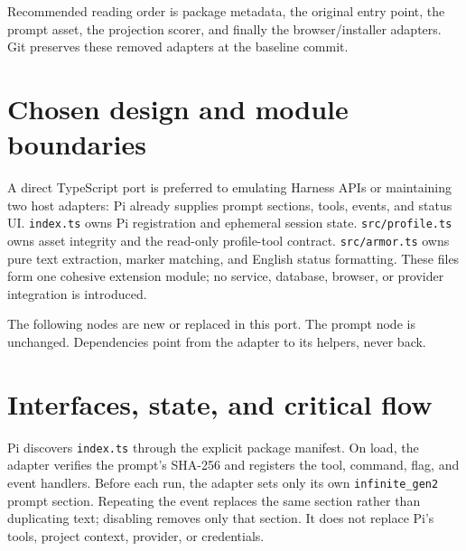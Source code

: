 \documentclass[10pt]{ltjsarticle}
\begin{document}
Recommended reading order is package metadata, the original entry point,
the prompt asset, the projection scorer, and finally the browser/installer
adapters. Git preserves these removed adapters at the baseline commit.

\section{Chosen design and module boundaries}
A direct TypeScript port is preferred to emulating Harness APIs or maintaining
two host adapters: Pi already supplies prompt sections, tools, events, and
status UI. \texttt{index.ts} owns Pi registration and ephemeral session state.
\texttt{src/profile.ts} owns asset integrity and the read-only profile-tool
contract. \texttt{src/armor.ts} owns pure text extraction, marker matching,
and English status formatting. These files form one cohesive extension
module; no service, database, browser, or provider integration is introduced.

The following nodes are new or replaced in this port. The prompt node is
unchanged. Dependencies point from the adapter to its helpers, never back.
\begin{center}
\end{center}

\section{Interfaces, state, and critical flow}
Pi discovers \texttt{index.ts} through the explicit package manifest. On load,
the adapter verifies the prompt's SHA-256 and registers the tool, command,
flag, and event handlers. Before each run, the adapter sets only its own
\texttt{infinite\_gen2} prompt section. Repeating the event replaces the same
section rather than duplicating text; disabling removes only that section.
It does not replace Pi's tools, project context, provider, or credentials.
\end{document}
